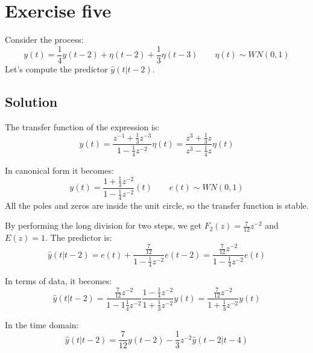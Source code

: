\section{Exercise five}

Consider the process: 
\[y(t)=\dfrac{1}{4}y(t-2)+\eta(t-2)+\dfrac{1}{3}\eta(t-3)\qquad \eta(t)\sim WN(0,1)\]
Let's compute the predictor $\hat{y}(t|t-2)$. 

\subsection*{Solution}
The transfer function of the expression is:
\[y(t)=\dfrac{z^{-1}+\frac{1}{3}z^{-3}}{1-\frac{1}{4}z^{-2}}\eta(t)=\dfrac{z^3+\frac{1}{3}z}{z^3-\frac{1}{4}z}\eta(t)\]

In canonical form it becomes: 
\[y(t)=\dfrac{1+\frac{1}{3}z^{-2}}{1-\frac{1}{4}z^{-2}}(t)\qquad e(t)\sim WN(0,1)\]
All the poles and zeros are inside the unit circle, so the transfer function is stable.

By performing the long division for two steps, we get $F_2(z)=\frac{7}{12}z^{-2}$ and $E(z)=1$. 
The predictor is: 
\[\hat{y}(t|t-2)=e(t)+\dfrac{\frac{7}{12}}{1-\frac{1}{4}z^{-2}}e(t-2)=\dfrac{\frac{7}{12}z^{-2}}{1-\frac{1}{4}z^{-2}}e(t)\]

In terms of data, it becomes:
\[\hat{y}(t|t-2)=\dfrac{\frac{7}{12}z^{-2}}{1-1\frac{1}{4}z^{-2}}\dfrac{1-\frac{1}{4}z^{-2}}{1+\frac{1}{3}z^{-2}}y(t)=\dfrac{\frac{7}{12}z^{-2}}{1+\frac{1}{3}z^{-2}}y(t)\]

In the time domain:
\[\hat{y}(t|t-2)=\frac{7}{12}y(t-2)-\frac{1}{3}z^{-2}\hat{y}(t-2|t-4)\]